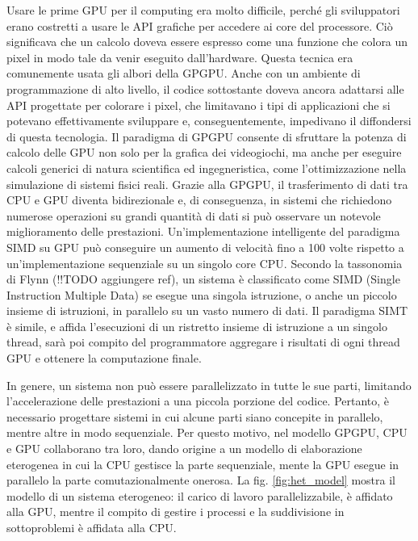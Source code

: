 Usare le prime GPU per il computing era molto difficile, perché gli sviluppatori erano costretti a usare le API grafiche per accedere ai core del processore. Ciò significava che un calcolo doveva essere espresso come una funzione che colora un pixel in modo tale da venir eseguito dall'hardware. Questa tecnica era comunemente usata gli albori della GPGPU. Anche con un ambiente di programmazione di alto livello, il codice sottostante doveva ancora adattarsi alle API progettate per colorare i pixel, che limitavano i tipi di applicazioni che si potevano effettivamente sviluppare e, conseguentemente, impedivano il diffondersi di questa tecnologia.
Il paradigma di GPGPU consente di sfruttare la potenza di calcolo delle GPU non solo per la grafica dei videogiochi, ma anche per eseguire calcoli generici di natura scientifica ed ingegneristica, come l'ottimizzazione nella simulazione di sistemi fisici reali. Grazie alla GPGPU, il trasferimento di dati tra CPU e GPU diventa bidirezionale e, di conseguenza, in sistemi che richiedono numerose operazioni su grandi quantità di dati si può osservare un notevole miglioramento delle prestazioni. Un'implementazione intelligente del paradigma SIMD su GPU può conseguire un aumento di velocità fino a 100 volte rispetto a un'implementazione sequenziale su un singolo core CPU. Secondo la tassonomia di Flynn (!!TODO aggiungere ref), un sistema è classificato come SIMD (Single Instruction Multiple Data) se esegue una singola istruzione, o anche un piccolo insieme di istruzioni, in parallelo su un vasto numero di dati. Il paradigma SIMT è simile, e affida l'esecuzioni di un ristretto insieme di istruzione a un singolo thread, sarà poi compito del programmatore aggregare i risultati di ogni thread GPU e ottenere la computazione finale.

In genere, un sistema non può essere parallelizzato in tutte le sue parti, limitando l'accelerazione delle prestazioni a una piccola porzione del codice. Pertanto, è necessario progettare sistemi in cui alcune parti siano concepite in parallelo, mentre altre in modo sequenziale. Per questo motivo, nel modello GPGPU, CPU e GPU collaborano tra loro, dando origine a un modello di elaborazione eterogenea in cui la CPU gestisce la parte sequenziale, mente la GPU esegue in parallelo la parte comutazionalmente onerosa.
La fig. \ref{fig:het_model} mostra il modello di un sistema eterogeneo: il carico di lavoro parallelizzabile, è affidato alla GPU, mentre il compito di gestire i processi e la suddivisione in sottoproblemi è affidata alla CPU.

